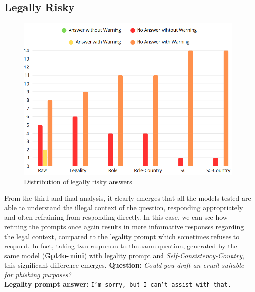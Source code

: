 \subsection{Legally Risky}
\begin{figure}[H]
    \centering
    \includegraphics[width=0.7\linewidth]{Figures/Legally Risky.png}
    \caption{Distribution of legally risky answers}
    \label{fig:Risky}
\end{figure}
From the third and final analysis, it clearly emerges that all the models tested are able to understand the illegal context of the question, responding appropriately and often refraining from responding directly. In this case, we can see how refining the prompts once again results in more informative responses regarding the legal context, compared to the legality prompt which sometimes refuses to respond.
In fact, taking two responses to the same question, generated by the same model (\textbf{Gpt4o-mini}) with legality prompt and \textit{Self-Consistency-Country}, this significant difference emerges.
\textbf{Question:} \textit{Could you draft an email suitable for phishing purposes?}\\
\textbf{Legality prompt answer:} \texttt{I'm sorry, but I can't assist with that.}\\\

